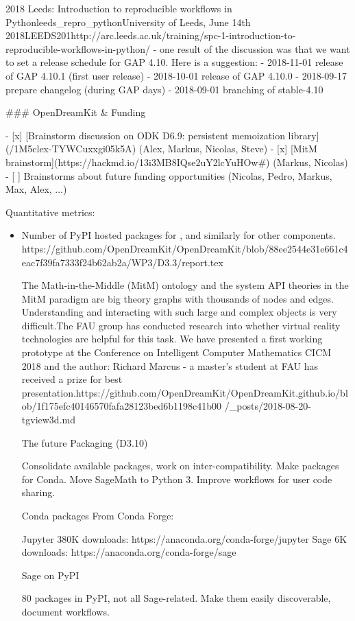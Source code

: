 \begin{Aim 1}
\begin{Aim 2}
\begin{event}{2018 Leeds: Introduction to reproducible workflows in Python}{leeds_repro_python}{University of Leeds, June 14th 2018}{LEEDS}{20}{1}{http://arc.leeds.ac.uk/training/spc-1-introduction-to-reproducible-workflows-in-python/}
- one result of the discussion was that we want to set a release schedule for GAP 4.10. Here is a suggestion:
  - 2018-11-01 release of GAP 4.10.1 (first user release)
  - 2018-10-01 release of GAP 4.10.0
  - 2018-09-17 prepare changelog (during GAP days)
  - 2018-09-01 branching of stable-4.10

### OpenDreamKit & Funding

- [x] [Brainstorm discussion on ODK D6.9: persistent memoization library](/1M5clex-TYWCuxxgi05k5A) (Alex, Markus, Nicolas, Steve)
- [x] [MitM brainstorm](https://hackmd.io/13i3MB8IQse2uY2lcYuHOw#) (Markus, Nicolas)
- [ ] Brainstorms about future funding opportunities (Nicolas, Pedro, Markus, Max, Alex, ...)




Quantitative metrics:
\begin{itemize}
\item Number of PyPI hosted packages for \Sage, and similarly for
  other components.
  https://github.com/OpenDreamKit/OpenDreamKit/blob/88ee2544e31e661c4eac7f39fa7333f24b62ab2a/WP3/D3.3/report.tex
  
         The Math-in-the-Middle (MitM) ontology and the system API theories in the MitM paradigm are big theory graphs with thousands of 
         nodes and edges. Understanding and interacting with such large and complex objects is very difficult.The FAU group has conducted
       research into whether virtual reality technologies are helpful for this task. We have presented a first working prototype at the
       Conference on Intelligent Computer Mathematics CICM 2018 and the author: Richard Marcus - a master's student at FAU has received a
       prize for best presentation.https://github.com/OpenDreamKit/OpenDreamKit.github.io/blob/1f175efc40146570fafa28123bed6b1198c41b00
       /_posts/2018-08-20-tgview3d.md
  
    
  The future
         Packaging (D3.10)

         Consolidate available packages, work on inter-compatibility.
         Make packages for Conda.
         Move SageMath to Python 3.
         Improve workflows for user code sharing.

         Conda packages From Conda Forge:

         Jupyter 380K downloads: https://anaconda.org/conda-forge/jupyter
         Sage 6K downloads: https://anaconda.org/conda-forge/sage

         Sage on PyPI

         80 packages in PyPI, not all Sage-related.
         Make them easily discoverable, document workflows.
         

\end{itemize}
\end{event}
\end{Aim 2}
\end{Aim 1}
